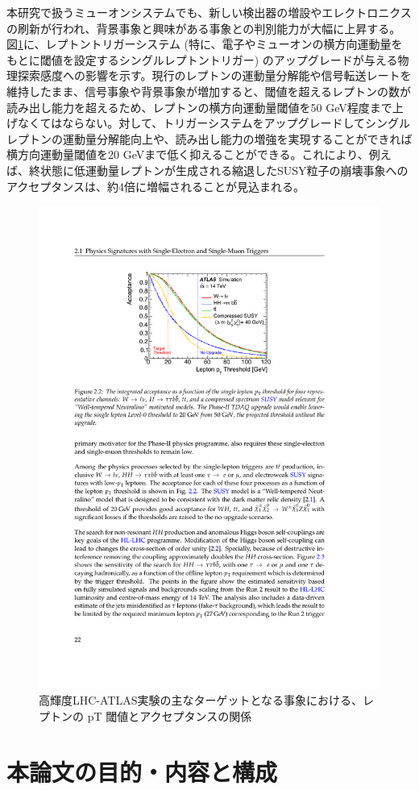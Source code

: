 本研究で扱うミューオンシステムでも、新しい検出器の増設やエレクトロニクスの刷新が行われ、背景事象と興味がある事象との判別能力が大幅に上昇する。
図\ref{Ptthreshold}に、レプトントリガーシステム (特に、電子やミューオンの横方向運動量をもとに閾値を設定するシングルレプトントリガー) のアップグレードが与える物理探索感度への影響を示す。現行のレプトンの運動量分解能や信号転送レートを維持したまま、信号事象や背景事象が増加すると、閾値を超えるレプトンの数が読み出し能力を超えるため、レプトンの横方向運動量閾値を50 GeV程度まで上げなくてはならない。対して、トリガーシステムをアップグレードしてシングルレプトンの運動量分解能向上や、読み出し能力の増強を実現することができれば横方向運動量閾値を20 GeVまで低く抑えることができる。これにより、例えば、終状態に低運動量レプトンが生成される縮退したSUSY粒子の崩壊事象へのアクセプタンスは、約4倍に増幅されることが見込まれる。

\begin{figure} 
\centering
\includegraphics[width=16cm]{fig/Intro/Ptthreshold.pdf}
\caption[高輝度LHC-ATLAS実験の主なターゲットとなる事象における、レプトンの pT 閾値とアクセプタンスの関係]{高輝度LHC-ATLAS実験の主なターゲットとなる事象における、レプトンの pT 閾値とアクセプタンスの関係\cite{tdr_phase2tdaq_2017020}}
\label{Ptthreshold}
\end{figure}


\section{本論文の目的・内容と構成}
\label{sec_intro_purpose}





